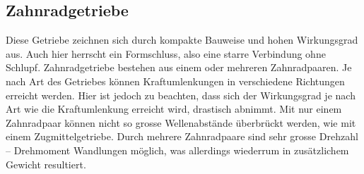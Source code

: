\subsection{Zahnradgetriebe}
Diese Getriebe zeichnen sich durch kompakte Bauweise und hohen Wirkungsgrad aus. Auch hier herrscht ein Formschluss, also eine starre Verbindung ohne Schlupf. Zahnradgetriebe bestehen aus einem oder mehreren Zahnradpaaren. Je nach Art des Getriebes können Kraftumlenkungen in verschiedene Richtungen erreicht werden. Hier ist jedoch zu beachten, dass sich der Wirkungsgrad je nach Art wie die Kraftumlenkung erreicht wird, drastisch abnimmt. Mit nur einem Zahnradpaar können nicht so grosse Wellenabstände überbrückt werden, wie mit einem Zugmittelgetriebe. Durch mehrere Zahnradpaare sind sehr grosse Drehzahl – Drehmoment Wandlungen möglich, was allerdings wiederrum in zusätzlichem Gewicht resultiert. 